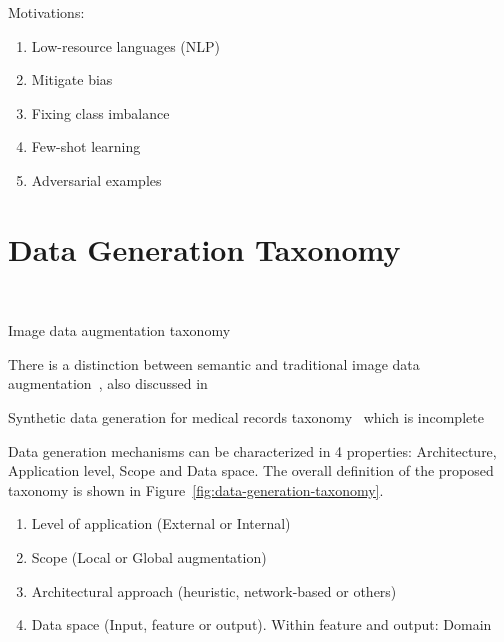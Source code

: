 \documentclass[parskip=full]{scrartcl}
\begin{document}

% 
% 
% 
% 


Motivations:

\begin{enumerate}
    \item Low-resource languages (NLP)
    \item Mitigate bias
    \item Fixing class imbalance
    \item Few-shot learning
    \item Adversarial examples
\end{enumerate}


\section{Data Generation Taxonomy}~\label{sec:taxonomy}

Image data augmentation taxonomy~\cite{khalifa2021comprehensive}

There is a distinction between semantic and traditional image data
augmentation~\cite{wang2021regularizing}, also discussed
in~\cite{shorten2019survey} 

Synthetic data generation for medical records
taxonomy~\cite{hernandez2022synthetic} which is incomplete



Data generation mechanisms can be characterized in 4 properties: Architecture,
Application level, Scope and Data space. The overall definition of the
proposed taxonomy is shown in Figure~\ref{fig:data-generation-taxonomy}.

\begin{enumerate}
    \item Level of application (External or Internal)
    \item Scope (Local or Global augmentation)
    \item Architectural approach (heuristic, network-based or others)
    \item Data space (Input, feature or output). Within feature and output: Domain
\end{enumerate}
\end{document}
